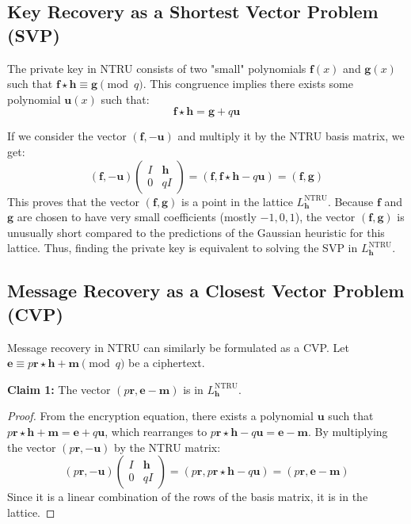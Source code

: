 \documentclass[12pt, a4paper]{article}
\theoremstyle{definition}
\theoremstyle{plain}
\begin{document}
\subsection{Key Recovery as a Shortest Vector Problem (SVP)}
The private key in NTRU consists of two "small" polynomials $\mathbf{f}(x)$ and $\mathbf{g}(x)$ such that $\mathbf{f} \star \mathbf{h} \equiv \mathbf{g} \pmod q$. This congruence implies there exists some polynomial $\mathbf{u}(x)$ such that:
\[
\mathbf{f} \star \mathbf{h} = \mathbf{g} + q\mathbf{u}
\]

If we consider the vector $(\mathbf{f}, -\mathbf{u})$ and multiply it by the NTRU basis matrix, we get:
\[
(\mathbf{f}, -\mathbf{u}) \begin{pmatrix} I & \mathbf{h} \\ 0 & qI \end{pmatrix} = (\mathbf{f}, \mathbf{f} \star \mathbf{h} - q\mathbf{u}) = (\mathbf{f}, \mathbf{g})
\]
This proves that the vector $(\mathbf{f}, \mathbf{g})$ is a point in the lattice $L_{\mathbf{h}}^{\text{NTRU}}$. Because $\mathbf{f}$ and $\mathbf{g}$ are chosen to have very small coefficients (mostly $-1, 0, 1$), the vector $(\mathbf{f}, \mathbf{g})$ is unusually short compared to the predictions of the Gaussian heuristic for this lattice. Thus, finding the private key is equivalent to solving the SVP in $L_{\mathbf{h}}^{\text{NTRU}}$.

\subsection{Message Recovery as a Closest Vector Problem (CVP)}
Message recovery in NTRU can similarly be formulated as a CVP. Let $\mathbf{e} \equiv p\mathbf{r} \star \mathbf{h} + \mathbf{m} \pmod q$ be a ciphertext. 

\textbf{Claim 1:} The vector $(p\mathbf{r}, \mathbf{e} - \mathbf{m})$ is in $L_{\mathbf{h}}^{\text{NTRU}}$.
\begin{proof}
From the encryption equation, there exists a polynomial $\mathbf{u}$ such that $p\mathbf{r} \star \mathbf{h} + \mathbf{m} = \mathbf{e} + q\mathbf{u}$, which rearranges to $p\mathbf{r} \star \mathbf{h} - q\mathbf{u} = \mathbf{e} - \mathbf{m}$. 
By multiplying the vector $(p\mathbf{r}, -\mathbf{u})$ by the NTRU matrix:
\[
(p\mathbf{r}, -\mathbf{u}) \begin{pmatrix} I & \mathbf{h} \\ 0 & qI \end{pmatrix} = (p\mathbf{r}, p\mathbf{r} \star \mathbf{h} - q\mathbf{u}) = (p\mathbf{r}, \mathbf{e} - \mathbf{m})
\]
Since it is a linear combination of the rows of the basis matrix, it is in the lattice.
\end{proof}
\end{document}
